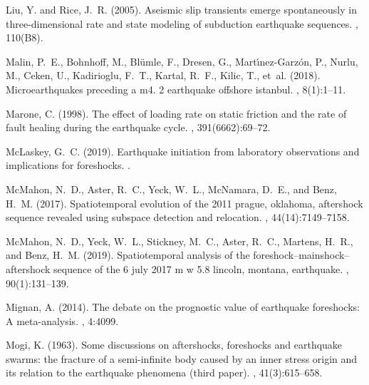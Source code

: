 \documentclass[a4paper,12pt,twoside]{article}
\begin{document}
\begin{thebibliography}{}
Liu, Y. and Rice, J.~R. (2005).
\newblock Aseismic slip transients emerge spontaneously in three-dimensional
  rate and state modeling of subduction earthquake sequences.
, 110(B8).

Malin, P.~E., Bohnhoff, M., Bl{\"u}mle, F., Dresen, G.,
  Mart{\'\i}nez-Garz{\'o}n, P., Nurlu, M., Ceken, U., Kadirioglu, F.~T.,
  Kartal, R.~F., Kilic, T., et~al. (2018).
\newblock Microearthquakes preceding a m4. 2 earthquake offshore istanbul.
, 8(1):1--11.

Marone, C. (1998).
\newblock The effect of loading rate on static friction and the rate of fault
  healing during the earthquake cycle.
, 391(6662):69--72.

McLaskey, G.~C. (2019).
\newblock Earthquake initiation from laboratory observations and implications
  for foreshocks.
.

McMahon, N.~D., Aster, R.~C., Yeck, W.~L., McNamara, D.~E., and Benz, H.~M.
  (2017).
\newblock Spatiotemporal evolution of the 2011 prague, oklahoma, aftershock
  sequence revealed using subspace detection and relocation.
, 44(14):7149--7158.

McMahon, N.~D., Yeck, W.~L., Stickney, M.~C., Aster, R.~C., Martens, H.~R., and
  Benz, H.~M. (2019).
\newblock Spatiotemporal analysis of the foreshock--mainshock--aftershock
  sequence of the 6 july 2017 m w 5.8 lincoln, montana, earthquake.
, 90(1):131--139.

Mignan, A. (2014).
\newblock The debate on the prognostic value of earthquake foreshocks: A
  meta-analysis.
, 4:4099.

Mogi, K. (1963).
\newblock Some discussions on aftershocks, foreshocks and earthquake swarms:
  the fracture of a semi-infinite body caused by an inner stress origin and its
  relation to the earthquake phenomena (third paper).
, 41(3):615--658.


\end{thebibliography}
\end{document}
